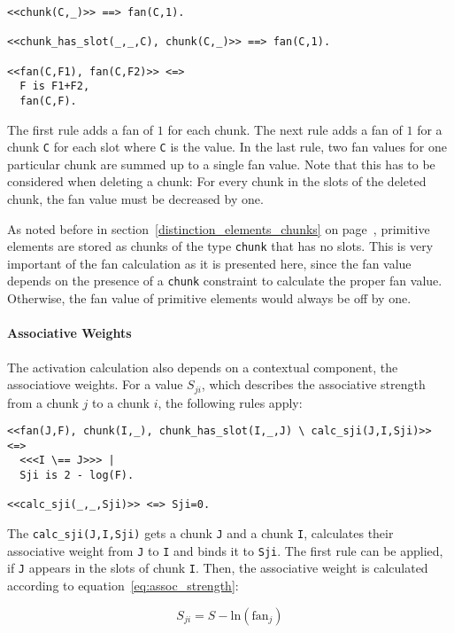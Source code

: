 \begin{lstlisting}
<<chunk(C,_)>> ==> fan(C,1).

<<chunk_has_slot(_,_,C), chunk(C,_)>> ==> fan(C,1).

<<fan(C,F1), fan(C,F2)>> <=> 
  F is F1+F2, 
  fan(C,F).
\end{lstlisting}

The first rule adds a fan of $1$ for each chunk. The next rule adds a fan of $1$ for a chunk \lstinline|C| for each slot where \lstinline|C| is the value. In the last rule, two fan values for one particular chunk are summed up to a single fan value. Note that this has to be considered when deleting a chunk: For every chunk in the slots of the deleted chunk, the fan value must be decreased by one.

As noted before in section~\ref{distinction_elements_chunks} on page~\pageref{distinction_elements_chunks}, primitive elements are stored as chunks of the type \lstinline|chunk| that has no slots. This is very important of the fan calculation as it is presented here, since the fan value depends on the presence of a \lstinline|chunk| constraint to calculate the proper fan value. Otherwise, the fan value of primitive elements would always be off by one.

\paragraph{Associative Weights}

The activation calculation also depends on a contextual component, the associatiove weights. For a value $S_{ji}$, which describes the associative strength from a chunk $j$ to a chunk $i$, the following rules apply:

\begin{lstlisting}
<<fan(J,F), chunk(I,_), chunk_has_slot(I,_,J) \ calc_sji(J,I,Sji)>> <=> 
  <<<I \== J>>> | 
  Sji is 2 - log(F).

<<calc_sji(_,_,Sji)>> <=> Sji=0.
\end{lstlisting}

The \lstinline|calc_sji(J,I,Sji)| gets a chunk \lstinline|J| and a chunk \lstinline|I|, calculates their associative weight from \lstinline|J| to \lstinline|I| and binds it to \lstinline|Sji|. The first rule can be applied, if \lstinline|J| appears in the slots of chunk \lstinline|I|. Then, the associative weight is calculated according to equation~\eqref{eq:assoc_strength}:

\begin{equation*}
S_{ji} = S - \mathrm{ln}(\mathrm{fan}_j) 
\end{equation*}

